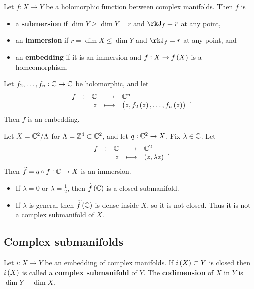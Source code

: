 \pagebreak

\begin{definition}
Let $ f : X \to Y $ be a holomorphic function between complex manifolds. Then $ f $ is
\begin{itemize}
\item a \textbf{submersion} if $ \dim Y \ge \dim Y = r $ and $ \rk \J_f = r $ at any point,
\item an \textbf{immersion} if $ r = \dim X \le \dim Y $ and $ \rk \J_f = r $ at any point, and
\item an \textbf{embedding} if it is an immersion and $ f : X \to f\br{X} $ is a homeomorphism.
\end{itemize}
\end{definition}

\begin{example}
Let $ f_2, \dots, f_n : \mathbb{C} \to \mathbb{C} $ be holomorphic, and let
$$ \function[f]{\CC}{\CC^n}{z}{\br{z, f_2\br{z}, \dots, f_n\br{z}}}. $$
Then $ f $ is an embedding.
\end{example}

\begin{example}
Let $ X = \mathbb{C}^2 / \Lambda $ for $ \Lambda = \mathbb{Z}^4 \subset \mathbb{C}^2 $, and let $ q : \mathbb{C}^2 \to X $. Fix $ \lambda \in \mathbb{C} $. Let
$$ \function[f]{\CC}{\CC^2}{z}{\br{z, \lambda z}}. $$
Then $ \widetilde{f} = q \circ f : \mathbb{C} \to X $ is an immersion.
\begin{itemize}
\item If $ \lambda = 0 $ or $ \lambda = \tfrac{1}{2} $, then $ \widetilde{f}\br{\CC} $ is a closed submanifold.
\item If $ \lambda $ is general then $ \widetilde{f}\br{\CC} $ is dense inside $ X $, so it is not closed. Thus it is not a complex submanifold of $ X $.
\end{itemize}
\end{example}

\subsection{Complex submanifolds}

\begin{definition}
Let $ i : X \to Y $ be an embedding of complex manifolds. If $ i\br{X} \subset Y $ is closed then $ i\br{X} $ is called a \textbf{complex submanifold} of $ Y $. The \textbf{codimension} of $ X $ in $ Y $ is $ \dim Y - \dim X $.
\end{definition}

